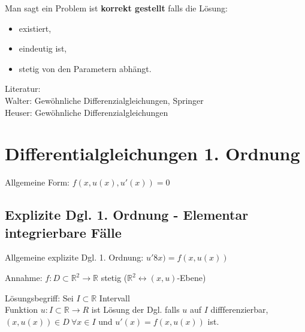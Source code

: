 \begin{definition}
Man sagt ein Problem ist \textbf{korrekt gestellt} falls die Lösung:
\begin{itemize}
    \item existiert,
    \item eindeutig ist,
    \item stetig von den Parametern abhängt.
\end{itemize}
\end{definition}

Literatur:\\
Walter: Gewöhnliche Differenzialgleichungen, Springer\\
Heuser: Gewöhnliche Differenzialgleichungen

\section{Differentialgleichungen 1. Ordnung}

Allgemeine Form: $f(x, u(x), u'(x)) = 0 $

\subsection{Explizite Dgl. 1. Ordnung - Elementar integrierbare Fälle}

Allgemeine explizite Dgl. 1. Ordnung:
$u'8x) = f(x, u(x)) $

Annahme: $f: D \subset \mathbb{R}^2 \rightarrow \mathbb{R} $ stetig
($\mathbb{R}^2 \leftrightarrow (x,u)$-Ebene)

Lösungsbegriff:
Sei $I \subset \mathbb{R} $ Intervall\\
Funktion $u: I \subset \mathbb{R} \rightarrow R $ ist Lösung der Dgl. falls
$u$ auf $I$ diffferenzierbar,\\
$(x, u(x)) \in D \ \forall x \in I $ und $u'(x) = f(x, u(x)) $ ist.

